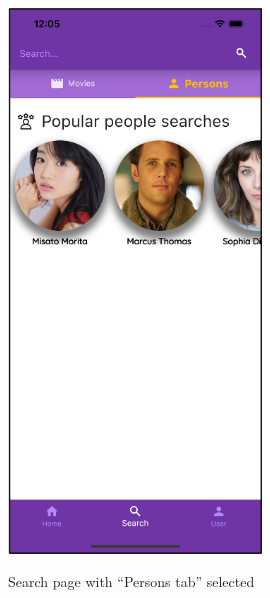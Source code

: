 \documentclass[12pt, a4paper]{article}
\numberwithin{figure}{section}
\begin{document}
\begin{center}
\begin{minipage}[t]{0.4\textwidth}
\begin{figure}[H]
			\includegraphics[width=0.6\textwidth]{images/final/searchPeople.png}\\
			\caption{Search page with “Persons tab” selected}
		\end{figure}
	\end{minipage}
\end{center}
\end{document}
